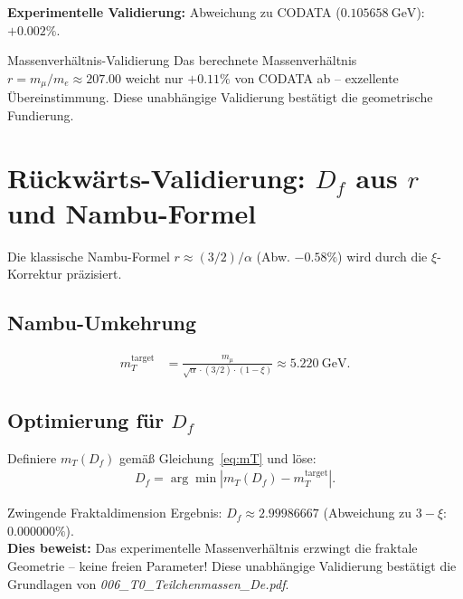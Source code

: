 	\textbf{Experimentelle Validierung:} Abweichung zu CODATA ($\SI{0.105658}{\giga\electronvolt}$): $+0.002\%$.
	
	\begin{important}{Massenverhältnis-Validierung}{}
		Das berechnete Massenverhältnis $r = m_{\mu} / m_e \approx 207.00$ weicht nur $+0.11\%$ von CODATA ab -- exzellente Übereinstimmung. Diese unabhängige Validierung bestätigt die geometrische Fundierung.
	\end{important}
	
	\section{Rückwärts-Validierung: $D_f$ aus $r$ und Nambu-Formel}
	\label{sec:rueckwaerts_validierung}
	
	Die klassische Nambu-Formel $r \approx (3/2)/\alpha$ (Abw. $-0.58\%$) wird durch die $\xi$-Korrektur präzisiert.
	
	\subsection{Nambu-Umkehrung}
	\label{subsec:nambu_umkehrung}
	
	\begin{align}
		m_T^{\text{target}} &= \frac{m_{\mu}}{\sqrt{\alpha} \cdot (3/2) \cdot (1 - \xi)} \approx \SI{5.220}{\giga\electronvolt}. \label{eq:mTtarget}
	\end{align}
	
	\subsection{Optimierung für $D_f$}
	\label{subsec:optimierung_df}
	
	Definiere $m_T(D_f)$ gemäß Gleichung~\ref{eq:mT} und löse:
	\begin{align}
		D_f = \arg\min \left| m_T(D_f) - m_T^{\text{target}} \right|. \label{eq:optDf}
	\end{align}
	
	\begin{keyresult}{Zwingende Fraktaldimension}{}
		Ergebnis: $D_f \approx 2.99986667$ (Abweichung zu $3 - \xi$: $0.000000\%$). \\
		\textbf{Dies beweist:} Das experimentelle Massenverhältnis erzwingt die fraktale Geometrie -- keine freien Parameter! Diese unabhängige Validierung bestätigt die Grundlagen von \emph{006\_T0\_Teilchenmassen\_De.pdf}.
	\end{keyresult}
	
